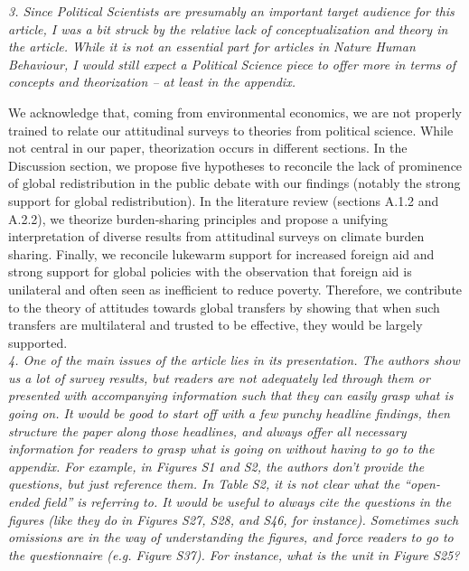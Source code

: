 \documentclass[12pt,english]{article}
\begin{document}
\textit{3. Since Political Scientists are presumably an important target audience for this article, I was a bit struck by the relative lack of conceptualization and theory in the article. While it is not an essential part for articles in Nature Human Behaviour, I would still expect a Political Science piece to offer more in terms of concepts and theorization – at least in the appendix.}

We acknowledge that, coming from environmental economics, we are not properly trained to relate our attitudinal surveys to theories from political science. 
While not central in our paper, theorization occurs in different sections. In the Discussion section, we propose five hypotheses to reconcile the lack of prominence of global redistribution in the public debate with our findings (notably the strong support for global redistribution). In the literature review (sections A.1.2 and A.2.2), we theorize burden-sharing principles and propose a unifying interpretation of diverse results from attitudinal surveys on climate burden sharing. %
Finally, we reconcile lukewarm support for increased foreign aid and strong support for global policies with the observation that foreign aid is unilateral and often seen as inefficient to reduce poverty. Therefore, we contribute to the theory of attitudes towards global transfers by showing that when such transfers are multilateral and trusted to be effective, they would be largely supported. %
~\\

\textit{4. One of the main issues of the article lies in its presentation. The authors show us a lot of survey results, but readers are not adequately led through them or presented with accompanying information such that they can easily grasp what is going on. It would be good to start off with a few punchy headline findings, then structure the paper along those headlines, and always offer all necessary information for readers to grasp what is going on without having to go to the appendix. For example, in Figures S1 and S2, the authors don’t provide the questions, but just reference them. In Table S2, it is not clear what the “open-ended field” is referring to. It would be useful to always cite the questions in the figures (like they do in Figures S27, S28, and S46, for instance). Sometimes such omissions are in the way of understanding the figures, and force readers to go to the questionnaire (e.g. Figure S37). For instance, what is the unit in Figure S25?}
\end{document}
